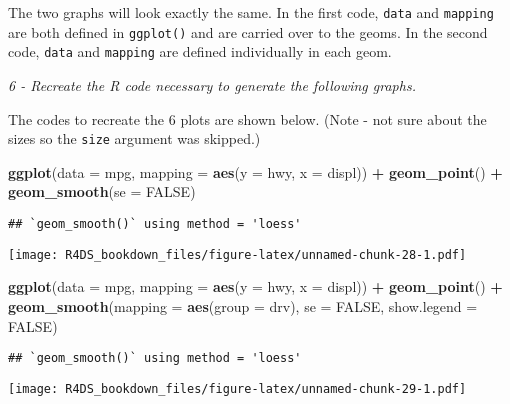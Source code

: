 \documentclass[]{article}
\newenvironment{Shaded}{\begin{snugshade}}{\end{snugshade}}
\newcommand{\KeywordTok}[1]{\textcolor[rgb]{0.13,0.29,0.53}{\textbf{#1}}}
\newcommand{\DataTypeTok}[1]{\textcolor[rgb]{0.13,0.29,0.53}{#1}}
\newcommand{\StringTok}[1]{\textcolor[rgb]{0.31,0.60,0.02}{#1}}
\newcommand{\OtherTok}[1]{\textcolor[rgb]{0.56,0.35,0.01}{#1}}
\newcommand{\OperatorTok}[1]{\textcolor[rgb]{0.81,0.36,0.00}{\textbf{#1}}}
\newcommand{\NormalTok}[1]{#1}
\theoremstyle{definition}
\theoremstyle{definition}
\theoremstyle{definition}
\theoremstyle{remark}
\begin{document}
The two graphs will look exactly the same. In the first code,
\texttt{data} and \texttt{mapping} are both defined in \texttt{ggplot()}
and are carried over to the geoms. In the second code, \texttt{data} and
\texttt{mapping} are defined individually in each geom.

\emph{6 - Recreate the R code necessary to generate the following
graphs.}

The codes to recreate the 6 plots are shown below. (Note - not sure
about the sizes so the \texttt{size} argument was skipped.)

\begin{Shaded}
\begin{Highlighting}[]
\KeywordTok{ggplot}\NormalTok{(}\DataTypeTok{data =}\NormalTok{ mpg, }\DataTypeTok{mapping =} \KeywordTok{aes}\NormalTok{(}\DataTypeTok{y =}\NormalTok{ hwy, }\DataTypeTok{x =}\NormalTok{ displ)) }\OperatorTok{+}\StringTok{ }
\StringTok{  }\KeywordTok{geom_point}\NormalTok{() }\OperatorTok{+}
\StringTok{  }\KeywordTok{geom_smooth}\NormalTok{(}\DataTypeTok{se =} \OtherTok{FALSE}\NormalTok{)}
\end{Highlighting}
\end{Shaded}

\begin{verbatim}
## `geom_smooth()` using method = 'loess'
\end{verbatim}

\texttt{[image: R4DS\_bookdown\_files/figure-latex/unnamed-chunk-28-1.pdf]}

\begin{Shaded}
\begin{Highlighting}[]
\KeywordTok{ggplot}\NormalTok{(}\DataTypeTok{data =}\NormalTok{ mpg, }\DataTypeTok{mapping =} \KeywordTok{aes}\NormalTok{(}\DataTypeTok{y =}\NormalTok{ hwy, }\DataTypeTok{x =}\NormalTok{ displ)) }\OperatorTok{+}\StringTok{ }
\StringTok{  }\KeywordTok{geom_point}\NormalTok{() }\OperatorTok{+}
\StringTok{  }\KeywordTok{geom_smooth}\NormalTok{(}\DataTypeTok{mapping =} \KeywordTok{aes}\NormalTok{(}\DataTypeTok{group =}\NormalTok{ drv), }\DataTypeTok{se =} \OtherTok{FALSE}\NormalTok{, }\DataTypeTok{show.legend =} \OtherTok{FALSE}\NormalTok{)}
\end{Highlighting}
\end{Shaded}

\begin{verbatim}
## `geom_smooth()` using method = 'loess'
\end{verbatim}

\texttt{[image: R4DS\_bookdown\_files/figure-latex/unnamed-chunk-29-1.pdf]}
\end{document}
